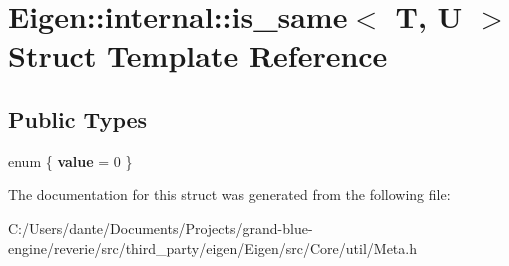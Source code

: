 \hypertarget{struct_eigen_1_1internal_1_1is__same}{}\section{Eigen\+::internal\+::is\+\_\+same$<$ T, U $>$ Struct Template Reference}
\label{struct_eigen_1_1internal_1_1is__same}
\subsection*{Public Types}
\begin{DoxyCompactItemize}
\item 
\mbox{\label{struct_eigen_1_1internal_1_1is__same_a9112d842203615796b73b808b6ff61dd}} 
enum \{ {\bfseries value} = 0
 \}
\end{DoxyCompactItemize}


The documentation for this struct was generated from the following file\+:\begin{DoxyCompactItemize}
\item 
C\+:/\+Users/dante/\+Documents/\+Projects/grand-\/blue-\/engine/reverie/src/third\+\_\+party/eigen/\+Eigen/src/\+Core/util/Meta.\+h\end{DoxyCompactItemize}
